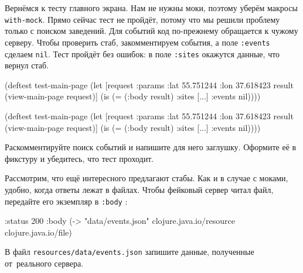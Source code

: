 Вернёмся к тесту главного экрана. Нам не нужны моки, поэтому уберём макросы
\verb|with-mock|. Прямо сейчас тест не пройдёт, потому что мы решили проблему
только с поиском заведений. Для событий код по-прежнему обращается к чужому
серверу. Чтобы проверить стаб, закомментируем события, а поле \verb|:events|
сделаем \verb|nil|. Тест пройдёт без ошибок: в поле \verb|:sites| окажутся
данные, что вернул стаб.

\ifx\DEVICETYPE\MOBILE

\begin{english}
  \begin{clojure}
(deftest test-main-page
  (let [request
        {:params {:lat 55.751244
                  :lon 37.618423}}
        result (view-main-page request)]
    (is (= (:body result)
           {:sites [...] :events nil}))))
  \end{clojure}
\end{english}

\else

\begin{english}
  \begin{clojure}
(deftest test-main-page
  (let [request {:params {:lat 55.751244
                          :lon 37.618423}}
        result (view-main-page request)]
    (is (= (:body result) {:sites [...] :events nil}))))
  \end{clojure}
\end{english}

\fi

Раскомментируйте поиск событий и напишите для него заглушку. Оформите её в
фикстуру и убедитесь, что тест проходит.

Рассмотрим, что ещё интересного предлагают стабы. Как и в случае с моками,
удобно, когда ответы лежат в файлах. Чтобы фейковый сервер читал файл, передайте
его экземпляр в \verb|:body| :


\begin{english}
  \begin{clojure}
{:status 200
 :body (-> "data/events.json"
           clojure.java.io/resource
           clojure.java.io/file)}
  \end{clojure}
\end{english}

\noindent
В файл \verb|resources/data/events.json| запишите данные, полученные
от~реального сервера.


